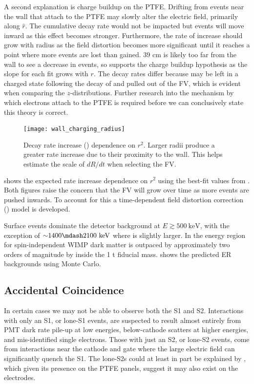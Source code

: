 A second explanation is charge buildup on the PTFE.  Drifting \electron from events near the wall that attach to the PTFE may slowly
alter the electric field, primarily along $\hat{r}$.  The cumulative decay rate would not be impacted but events will move
inward as this effect becomes stronger.  Furthermore, the rate of increase should grow with radius as the field distortion
becomes more significant until it reaches a point where more events are lost than gained.  39 cm is likely too far from the wall
to see a decrease in events, so
 supports the charge buildup hypothesis as the slope for each fit grows with $r$.  The
decay rates differ because  may be left in a charged state following the decay of  and pulled out of the
FV, which is evident when comparing the $z$-distributions.  Further research into the mechanism by which electrons attach to the PTFE is
required before we can conclusively state this theory is correct.

\begin{figure}
\centering
\texttt{[image: wall\_charging\_radius]}
\caption{Decay rate increase () dependence on $r^2$.  Larger radii produce a greater rate increase due
to their proximity to the wall.  This helps estimate the scale of $dR/dt$ when selecting the FV.}
\label{fig:backgrounds_detector_materials_wall_charge_radius}
\end{figure}

 shows the expected rate increase dependence on $r^2$ using the best-fit
values from .  Both figures
raise the concern that the FV will grow over time as more events are pushed inwards.  To account for this a time-dependent field
distortion correction () model is developed.

Surface events dominate the detector background at $E \gtrsim 500\ \mathrm{keV}$, with the exception of
${\sim} 1400 \mdash 2100\ \mathrm{keV}$ where  is slightly larger.  In the energy region for spin-independent WIMP dark
matter  is outpaced by approximately two orders of magnitude by  inside the 1 t
fiducial mass.   shows the predicted ER backgrounds using Monte Carlo.



\subsection{Accidental Coincidence}
\label{subsec:backgrounds_ac}
In certain cases we may not be able to observe both the S1 and S2.  Interactions with only an S1, or lone-S1 events, are suspected to
result almost entirely from PMT dark rate pile-up at low energies, below-cathode scatters at higher energies, and mis-identified single
electrons.  Those with just an S2, or lone-S2
events, come from interactions near the cathode and gate where the large electric field can significantly quench the S1.  The lone-S2s
could at least in part be explained by , which given its presence on the PTFE panels, suggest it may also exist on the
electrodes.

